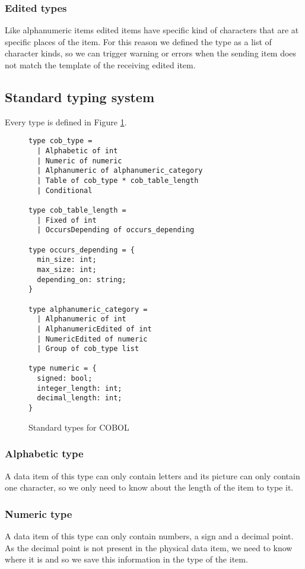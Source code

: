 \documentclass[a4paper,10pt]{article}
\begin{document}
\subsubsection{Edited types}
Like alphanumeric items edited items have specific kind of characters that are at specific
places of the item. For this reason we defined the type as a list of character kinds, so
we can trigger warning or errors when the sending item does not match the template of the
receiving edited item.

\subsection{Standard typing system}
Every type is defined in Figure \ref{fig:standard_types}.
\begin{figure}[!ht]
  \centering
  \begin{verbatim}
type cob_type =
  | Alphabetic of int
  | Numeric of numeric
  | Alphanumeric of alphanumeric_category
  | Table of cob_type * cob_table_length
  | Conditional

type cob_table_length =
  | Fixed of int
  | OccursDepending of occurs_depending

type occurs_depending = {
  min_size: int;
  max_size: int;
  depending_on: string;
}

type alphanumeric_category =
  | Alphanumeric of int
  | AlphanumericEdited of int
  | NumericEdited of numeric
  | Group of cob_type list

type numeric = {
  signed: bool;
  integer_length: int;
  decimal_length: int;
}
  \end{verbatim}
  \caption{Standard types for COBOL}
  \label{fig:standard_types}
\end{figure}

\subsubsection{Alphabetic type}
A data item of this type can only contain letters and its picture can only contain one character, so
we only need to know about the length of the item to type it.

\subsubsection{Numeric type}
A data item of this type can only contain numbers, a sign and a decimal point. As the decimal point
is not present in the physical data item, we need to know where it is and so we save this information
in the type of the item.
\end{document}
